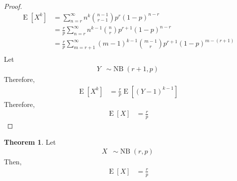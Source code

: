 \documentclass[titlepage, fleqn, a4paper, 12pt, twoside]{article}
\theoremstyle{definition}
\theoremstyle{theorem}
\newtheorem{theorem}{Theorem}
\DeclareMathOperator{\expct}{\mathrm{E}}
\DeclareMathOperator{\nb}{\mathrm{NB}}
\begin{document}
\begin{proof}
	\begin{align*}
		\expct\left[ X^k \right] & = \sum\limits_{n = r}^{\infty} n^k \binom{n - 1}{r - 1} p^r (1 - p)^{n - r}                                     \\
                                         & = \frac{r}{p} \sum\limits_{n = r}^{\infty} n^{k - 1} \binom{n}{r} p^{r + 1} (1 - p)^{n - r}                     \\
                                         & = \frac{r}{p} \sum\limits_{m = r + 1}^{\infty} (m - 1)^{k - 1} \binom{m - 1}{r} p^{r + 1} (1 - p)^{m - (r + 1)} \\
	\end{align*}
	Let
	\begin{align*}
		Y & \sim \nb(r + 1,p)
	\end{align*}
	Therefore,
	\begin{align*}
		\expct\left[ X^k \right] & = \frac{r}{p} \expct\left[ (Y - 1)^{k - 1} \right]
	\end{align*}
	Therefore,
	\begin{align*}
		\expct[X] & = \frac{r}{p}
	\end{align*}
\end{proof}

\begin{theorem}
	Let
	\begin{align*}
		X & \sim \nb(r,p)
	\end{align*}
	Then,
	\begin{align*}
		\expct[X] & = \frac{r}{p}
	\end{align*}
\end{theorem}
\end{document}
